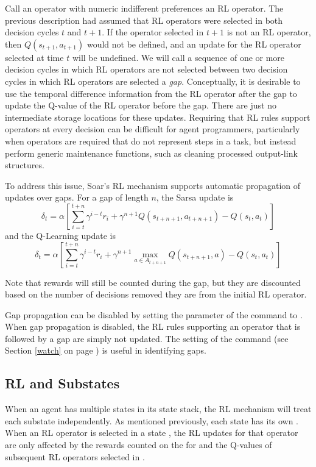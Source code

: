 Call an operator with numeric indifferent preferences an RL operator.
The previous description had assumed that RL operators were selected in both decision cycles $t$ and $t+1$.
If the operator selected in $t+1$ is not an RL operator, then $Q(s_{t+1}, a_{t+1})$ would not be defined, and an update for the RL operator selected at time $t$ will be undefined.
We will call a sequence of one or more decision cycles in which RL operators are not selected between two decision cycles in which RL operators are selected a \emph{gap}.
Conceptually, it is desirable to use the temporal difference information from the RL operator after the gap to update the Q-value of the RL operator before the gap.
There are just no intermediate storage locations for these updates.
Requiring that RL rules support operators at every decision can be difficult for agent programmers, particularly when operators are required that do not represent steps in a task, but instead perform generic maintenance functions, such as cleaning processed output-link structures.

To address this issue, Soar's RL mechanism supports automatic propagation of updates over gaps.
For a gap of length $n$, the Sarsa update is
$$\delta_t = \alpha \left[ \sum_{i=t}^{t+n}{\gamma^{i-t} r_i} + \gamma^{n+1} Q(s_{t+n+1}, a_{t+n+1}) - Q(s_t, a_t) \right]$$
and the Q-Learning update is
$$\delta_t = \alpha \left[ \sum_{i=t}^{t+n}{\gamma^{i-t} r_i} + \gamma^{n+1} \underset{a \in A_{t+n+1}}{\max} Q(s_{t+n+1}, a) - Q(s_t, a_t) \right]$$

Note that rewards will still be counted during the gap, but they are discounted based on the number of decisions removed they are from the initial RL operator.

Gap propagation can be disabled by setting the  parameter of the  command to .
When gap propagation is disabled, the RL rules supporting an operator that is followed by a gap are simply not updated.
The  setting of the  command (see Section \ref{watch} on page \pageref{watch}) is useful in identifying gaps.


\subsection{RL and Substates}
\label{RL-substates}

When an agent has multiple states in its state stack, the RL mechanism will treat each substate independently.
As mentioned previously, each state has its own .
When an RL operator is selected in a state , the RL updates for that operator are only affected by the rewards counted on the  for  and the Q-values of subsequent RL operators selected in .

